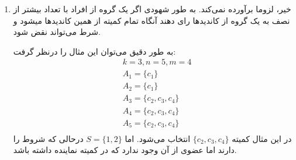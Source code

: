 \documentclass[12pt]{article}
\begin{document}
\begin{enumerate}
{\begin{itemize}
{                اما در هسته بودن خاصیت قوی‌تری است. به طور شهودی دلیل آن این است که 
                گروه‌های بزرگی که لزوما به اندازه بزرگیشان اشتراک ندارند ممکن است
                کمیته را بلوکه کنند، در حالی که اصلا شروط اولیه 
                را برآورده نمی‌کنند. با یک مثال این موضوع را نشان می‌دهیم:

                        \begin{align*}
            &k=3, n=6, m=4 \\
            &A_1 = \{c_1\} \\ 
            &A_2 = \{c_1, c_2, c_3\} \\ 
            &A_3 = \{c_1, c_2, c_4\} \\ 
            &A_4 = \{c_1, c_2, c_5\} \\ 
            &A_5 = \{c_3, c_4, c_5\} \\ 
            &A_6 = \{c_3, c_4, c_5\} \\
            \\ 
            &W = \{c_3, c_4, c_5\}
        \end{align*}

        در این مثال، کمیته داده شده دارای
        است. چراکه اگر $S$
        دوعضوی باشد حتما یکی از آنها کاندیدی با شماره بالاتر از یک دارند، و اگر چهار
        عضوی باشد، آنگاه در شرط اولیه 
        صدق نمی‌کند. اما این کمیته در هسته نیست.
        در نظر می‌گیریم:
        \begin{align*}
            S &= \{1, 2, 3, 4\} \\
            T &= \{c_1, c_2\}
        \end{align*}

        در این صورت به راحتی قابل مشاهده است که $S$
        این کمیته را بلوکه می‌کند.

        درنتیجه در هسته بودن، قوی‌تر از 
        است.

                
            }
        \end{itemize}
    }
    \item {
        خیر، لزوما برآورده نمی‌کند. به طور شهودی اگر یک گروه از افراد با تعداد
        بیشتر از نصف به یک گروه از کاندیدها رای دهند آنگاه تمام کمیته از همین
        کاندیدها میشود
        و شرط 
        می‌تواند نقض شود.

        به طور دقیق می‌توان این مثال را درنظر گرفت:
        \begin{align*}
            &k=3, n=5, m=4 \\
            &A_1 = \{c_1\} \\ 
            &A_2 = \{c_1\} \\ 
            &A_3 = \{c_2, c_3, c_4\} \\ 
            &A_4 = \{c_2, c_3, c_4\} \\ 
            &A_5 = \{c_2, c_3, c_4\} \\ 
        \end{align*}
        در این مثال کمیته
        $\{c_2, c_3, c_4\}$
        انتخاب می‌شود. اما
        $S = \{1,2\}$
        درحالی که شروط 
        را دارند اما عضوی از آن وجود ندارد که در کمیته نماینده داشته باشد.
        
}
\end{enumerate}
\end{document}

